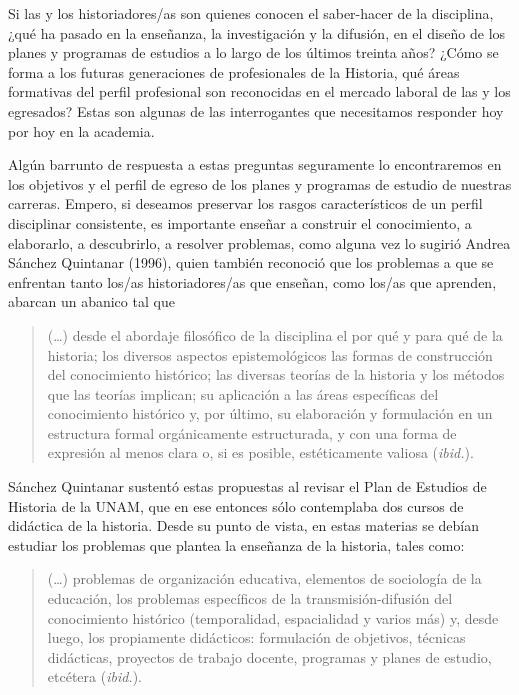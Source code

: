 Si las y los historiadores\slash{}as son quienes conocen el saber-hacer de la disciplina, ¿qué ha pasado en la enseñanza, la investigación y la difusión, en el
diseño de los planes y programas de estudios a lo largo de los últimos treinta años? ¿Cómo se forma a los futuras generaciones de profesionales de la Historia, qué áreas formativas del perfil profesional son reconocidas en el mercado laboral de las y los egresados? Estas son algunas de las interrogantes que necesitamos responder hoy por hoy en la academia. 

\enlargethispage{1\baselineskip}
Algún barrunto de respuesta a estas preguntas seguramente lo encontraremos en los objetivos y el perfil de egreso de los planes y programas de estudio de nuestras carreras. Empero, si deseamos preservar los rasgos característicos de un perfil disciplinar consistente, es importante
enseñar a construir el conocimiento, a elaborarlo, a descubrirlo, a
resolver problemas, como alguna vez lo sugirió  Andrea Sánchez Quintanar (1996), quien también reconoció que los problemas a que se enfrentan tanto los\slash{}as historiadores\slash{}as que enseñan, como los\slash{}as que aprenden, abarcan un abanico tal que 

\begin{quote}
(\ldots) desde el abordaje filosófico de la disciplina \textemdash{}el por qué y para qué de la historia\textemdash{}; los diversos aspectos epistemológicos{} \textemdash{}las formas de
construcción del conocimiento histórico; las diversas teorías de la
historia y los métodos que las teorías implican; su aplicación a las áreas
específicas del conocimiento histórico y, por último, su elaboración y
formulación en un estructura formal orgánicamente estructurada, y con una
forma de expresión al menos clara o, si es posible, estéticamente valiosa
(\textit{ibid.}).
\end{quote}
\enlargethispage{1\baselineskip}
Sánchez Quintanar sustentó estas propuestas al revisar el
Plan de Estudios de Historia de la UNAM, que en ese entonces sólo contemplaba
dos cursos de didáctica de la historia. Desde su punto de vista, en estas
materias se debían estudiar los problemas que plantea la enseñanza de la
historia, tales como:

\begin{quotation}
(\ldots) problemas de organización educativa, elementos de sociología de la
educación, los problemas específicos de la transmisión-difusión del
conocimiento histórico (temporalidad, espacialidad y varios más) y, desde
luego, los propiamente didácticos: formulación de objetivos, técnicas
didácticas, proyectos de trabajo docente, programas y planes de estudio,
etcétera (\textit{ibid.}).
\end{quotation}


